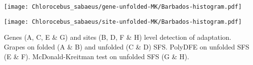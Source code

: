 \documentclass{article}
\begin{document}
\begin{minipage}{0.49\linewidth}
    \texttt{[image: Chlorocebus\_sabaeus/gene-unfolded-MK/Barbados-histogram.pdf]}
\end{minipage}%
\hfill
\begin{minipage}{0.49\linewidth}
    \texttt{[image: Chlorocebus\_sabaeus/site-unfolded-MK/Barbados-histogram.pdf]}
\end{minipage}
\hfill
\flushleft
Genes (A, C, E \& G) and sites (B, D, F \& H) level detection of adaptation.
Grapes on folded (A \& B) and unfolded (C \& D) SFS.
PolyDFE on unfolded SFS (E \& F).
McDonald-Kreitman test on unfolded SFS (G \& H).

\pagebreak
\end{document}
